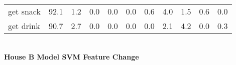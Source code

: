 \documentclass{article}
\begin{document}
\begin{sideways}
\begin{tabular}{lrrrrrrrrrr}
get snack         &        92.1 &                1.2 &               0.0 &                0.0 &                0.0 &              0.6 &                      4.0 &                   1.5 &              0.6 &              0.0 \\
get drink         &        90.7 &                2.7 &               0.0 &                0.0 &                0.0 &              0.0 &                      2.1 &                   4.2 &              0.0 &              0.3 \\
\bottomrule
\end{tabular}
\end{sideways}
\normalsize
\vspace{1cm}\\
\textbf{House B Model SVM Feature Change}\\
\vspace{1cm}\\
\end{document}
